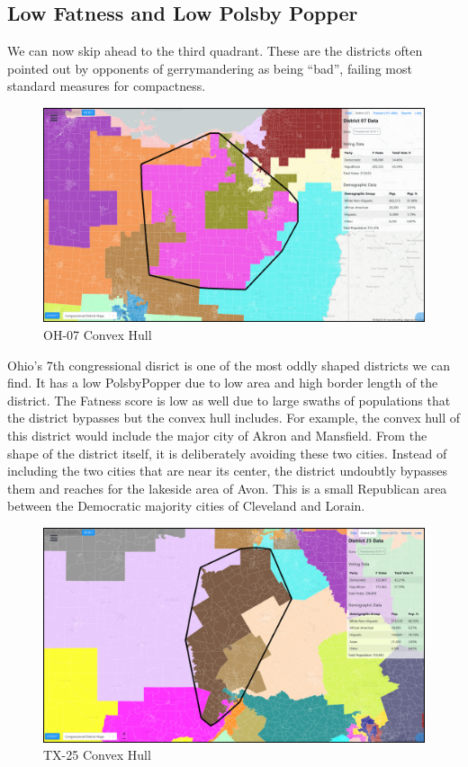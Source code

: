 \documentclass[letterpaper]{article}
\begin{document}
\subsection{Low Fatness and Low Polsby Popper}
We can now skip ahead to the third quadrant. These are the districts often pointed out by opponents of gerrymandering as being “bad”, failing most standard measures for compactness.

\begin{figure}[H]
	\includegraphics[width=\linewidth]{./figures/OH-07-ConvexHull.png}
	\caption{OH-07 Convex Hull}
	\label{fig:oh07ch}
\end{figure}
Ohio's 7th congressional disrict is one of the most oddly shaped districts we can find. It has a low PolsbyPopper due to low area and high border length of the district. The Fatness score is low as well due to large swaths of populations that the district bypasses but the convex hull includes. For example, the convex hull of this district would include the major city of Akron and Mansfield. From the shape of the district itself, it is deliberately avoiding these two cities. Instead of including the two cities that are near its center, the district undoubtly bypasses them and reaches for the lakeside area of Avon. This is a small Republican area between the Democratic majority cities of Cleveland and Lorain.

\begin{figure}[H]
	\includegraphics[width=\linewidth]{./figures/TX-25-ConvexHull.png}
	\caption{TX-25 Convex Hull}
	\label{fig:tx25ch}
\end{figure}
\end{document}
